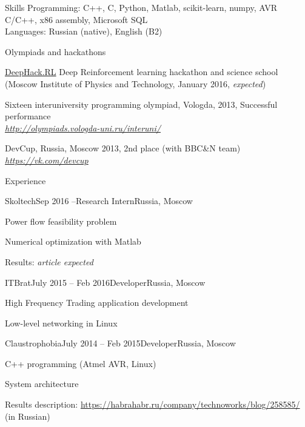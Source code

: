\documentclass{resume} %
\begin{document}
\begin{rSection}{Skills}
Programming: C++, C, Python, Matlab, scikit-learn, numpy, AVR C/C++, x86 assembly, Microsoft SQL\\
Languages: Russian (native), English (B2)
\end{rSection}


\begin{rSection}{Olympiads and hackathons}
\item \href{http://rl.deephack.me/}{DeepHack.RL} Deep Reinforcement learning hackathon and science school (Moscow Institute of Physics and Technology, January 2016, {\em expected})
\item Sixteen interuniversity programming olympiad, Vologda, 2013, Successful performance \\
\hfill {\em \url{http://olympiads.vologda-uni.ru/interuni/}}
\item DevCup, Russia, Moscow 2013, 2nd place (with BBC\&N team)\\
\hfill {\em \url{https://vk.com/devcup}}
\end{rSection}
\newpage

\begin{rSection}{Experience}
\begin{rSubsection}{Skoltech}{Sep 2016 --}{Research Intern}{Russia, Moscow}
	\item Power flow feasibility problem
	\item Numerical optimization with Matlab
	\item Results: \em article expected
\end{rSubsection}

\begin{rSubsection}{ITBrat}{July 2015 -- Feb 2016}{Developer}{Russia, Moscow}
	\item High Frequency Trading application development
	\item Low-level networking in Linux
\end{rSubsection}
	
\begin{rSubsection}{Claustrophobia}{July 2014 -- Feb 2015}{Developer}{Russia, Moscow}
	\item C++ programming (Atmel AVR, Linux)
	\item System architecture
	\item Results description: \url{https://habrahabr.ru/company/technoworks/blog/258585/} (in Russian)
\end{rSubsection}
	
	
\end{rSection}
\end{document}
